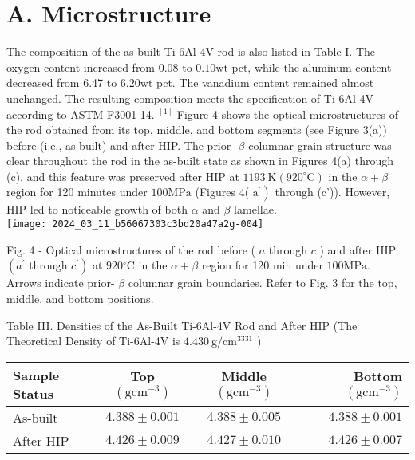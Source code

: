 \documentclass[10pt]{article}
\begin{document}
\section*{A. Microstructure}
The composition of the as-built Ti-6Al-4V rod is also listed in Table I. The oxygen content increased from 0.08 to $0.10 \mathrm{wt}$ pct, while the aluminum content decreased from 6.47 to $6.20 \mathrm{wt}$ pct. The vanadium content remained almost unchanged. The resulting composition meets the specification of Ti-6Al-4V according to ASTM F3001-14. ${ }^{[1]}$ Figure 4 shows the optical microstructures of the rod obtained from its top, middle, and bottom segments (see Figure 3(a)) before (i.e., as-built) and after HIP. The prior- $\beta$ columnar grain structure was clear throughout the rod in the as-built state as shown in Figures 4(a) through (c), and this feature was preserved after HIP at $1193 \mathrm{~K}\left(920^{\circ} \mathrm{C}\right)$ in the $\alpha+\beta$ region for 120 minutes under $100 \mathrm{MPa}$ (Figures 4( $\left.\mathrm{a}^{\prime}\right)$ through (c')). However, HIP led to noticeable growth of both $\alpha$ and $\beta$ lamellae.\\
\texttt{[image: 2024\_03\_11\_b56067303c3bd20a47a2g-004]}

Fig. 4 - Optical microstructures of the rod before ( $a$ through $c$ ) and after HIP $\left(a^{\prime}\right.$ through $\left.c^{\prime}\right)$ at $920{ }^{\circ} \mathrm{C}$ in the $\alpha+\beta$ region for 120 min under $100 \mathrm{MPa}$. Arrows indicate prior- $\beta$ columnar grain boundaries. Refer to Fig. 3 for the top, middle, and bottom positions.

Table III. Densities of the As-Built Ti-6Al-4V Rod and After HIP (The Theoretical Density of Ti-6Al-4V is $4.430 \mathrm{~g} / \mathrm{cm}^{3331}$ )

\begin{center}
\begin{tabular}{lccr}
\hline
Sample Status & Top $\left(\mathrm{g} \mathrm{cm}^{-3}\right)$ & Middle $\left(\mathrm{g} \mathrm{cm}^{-3}\right)$ & Bottom $\left(\mathrm{g} \mathrm{cm}^{-3}\right)$ \\
\hline
As-built & $4.388 \pm 0.001$ & $4.388 \pm 0.005$ & $4.388 \pm 0.001$ \\
After HIP & $4.426 \pm 0.009$ & $4.427 \pm 0.010$ & $4.426 \pm 0.007$ \\
\hline
\end{tabular}
\end{center}
\end{document}

